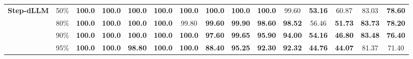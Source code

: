 \begin{table}[t]
{\begin{tabular}{@{}ll cccccccc ccccc@{}}
\midrule
\multirow{4}{*}{\textbf{Step-dLLM}}
  & 50\% & \textbf{100.0} & \textbf{100.0} & \textbf{100.0} & \textbf{100.0}
    & \textbf{100.0} & \textbf{100.0} & \textbf{100.0} & \textbf{100.0}
    & 99.60 & \textbf{53.16} & 60.87 & 83.03 & \textbf{78.60} \\
  & 80\% & \textbf{100.0} & \textbf{100.0} & \textbf{100.0} & \textbf{100.0}
    & 99.80 & \textbf{99.60} & \textbf{99.90} & \textbf{98.60}
    & \textbf{98.52} & 56.46 & \textbf{51.73} & \textbf{83.73} & \textbf{78.20} \\
  & 90\% & \textbf{100.0} & \textbf{100.0} & \textbf{100.0} & \textbf{100.0}
    & \textbf{100.0} & \textbf{97.60} & \textbf{99.65} & \textbf{95.90}
    & \textbf{94.00} & \textbf{54.16} & \textbf{46.80} & \textbf{83.48} & \textbf{76.40} \\
  & 95\% & \textbf{100.0} & \textbf{100.0} & \textbf{98.80} & \textbf{100.0}
    & \textbf{100.0} & \textbf{88.40} & \textbf{95.25} & \textbf{92.30}
    & \textbf{92.32} & \textbf{44.76} & \textbf{44.07} & 81.37 & 71.40 \\
\bottomrule
\end{tabular}%
}
\end{table}
